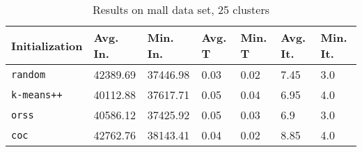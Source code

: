 \begin{table}[h]
	\begin{center}
		\begin{tabular}{|l|l|l|l|l|l|l|}
			\hline
			Initialization & Avg. In. & Min. In. & Avg. T & Min. T & Avg. It. & Min. It.\\\hline
			\texttt{random} & 42389.69 & 37446.98 & 0.03 & 0.02 & 7.45 & 3.0\\\hline
			\texttt{k-means++} & 40112.88 & 37617.71 & 0.05 & 0.04 & 6.95 & 4.0\\\hline
			\texttt{orss} & 40586.12 & 37425.92 & 0.05 & 0.03 & 6.9 & 3.0\\\hline
			\texttt{coc} & 42762.76 & 38143.41 & 0.04 & 0.02 & 8.85 & 4.0\\\hline
		\end{tabular}
		\caption{Results on mall data set, 25 clusters}
		\label{tbl:mall25}
	\end{center}
\end{table}

